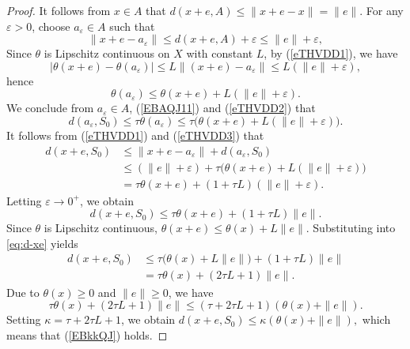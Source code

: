 \documentclass[11pt]{article}
\begin{document}
\begin{proof}
	It follows from  \(x \in A\)  that \(d(x+e, A) \le \|x+e - x\| = \|e\|\).
	For any \(\varepsilon > 0\), choose \(a_\varepsilon \in A\) such that
	\begin{equation}\label{eTHVDD1}
		\|x+e - a_\varepsilon\| \le d(x+e, A) + \varepsilon \le \|e\| + \varepsilon,
	\end{equation}
	Since  \(\theta\) is Lipschitz continuous on \(X\) with constant \(L\),  by (\ref{eTHVDD1}), we have 
	\[
	|\theta(x+e) - \theta(a_\varepsilon)| \le L \|(x+e) - a_\varepsilon\| \le L(\|e\| + \varepsilon),
	\]
	hence
	\begin{equation}\label{eTHVDD2}
		\theta(a_\varepsilon) \le \theta(x+e) + L(\|e\| + \varepsilon).
	\end{equation}
	We conclude from  \(a_\varepsilon \in A\),  (\ref{EBAQJ11})  and  (\ref{eTHVDD2})  that
	\begin{equation}\label{eTHVDD3}
		d(a_\varepsilon, S_0) \le \tau \theta(a_\varepsilon) \le \tau\bigl(\theta(x+e) + L(\|e\| + \varepsilon)\bigr).
	\end{equation}
	It follows from  (\ref{eTHVDD1})  and  (\ref{eTHVDD3})    that
	\[
	\begin{aligned}
		d(x+e, S_0) &\le \|x+e - a_\varepsilon\| + d(a_\varepsilon, S_0) \\
		&\le (\|e\| + \varepsilon) + \tau\bigl(\theta(x+e) + L(\|e\| + \varepsilon)\bigr) \\
		&= \tau \theta(x+e) + (1 + \tau L)(\|e\| + \varepsilon).
	\end{aligned}
	\]
	Letting \(\varepsilon \to 0^+\), we obtain
	\begin{equation}\label{eq:d-xe}
		d(x+e, S_0) \le \tau \theta(x+e) + (1 + \tau L)\|e\|.
	\end{equation}
	Since  \(\theta\) is Lipschitz continuous, \(\theta(x+e) \le \theta(x) + L\|e\|\). Substituting into \eqref{eq:d-xe} yields
	\[
	\begin{aligned}
		d(x+e, S_0) &\le \tau\bigl(\theta(x) + L\|e\|\bigr) + (1 + \tau L)\|e\| \\
		&= \tau \theta(x) + (2\tau L + 1)\|e\|.
	\end{aligned}
	\]
	Due to  \(\theta(x) \ge 0\) and \(\|e\| \ge 0\), we have
	\[
	\tau \theta(x) + (2\tau L + 1)\|e\| \le (\tau + 2\tau L + 1)(\theta(x) + \|e\|).
	\]
	Setting \(\kappa = \tau + 2\tau L + 1\), we obtain
	$	d(x+e, S_0) \le \kappa (\theta(x) + \|e\|),$
	which means that  (\ref{EBkkQJ}) holds.
	
	
	

\end{proof}
\end{document}
